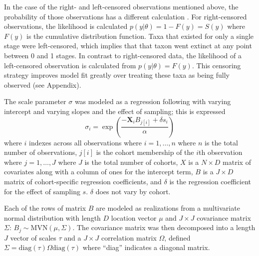 \documentclass[11pt]{article}
\begin{document}
In the case of the right- and left-censored observations mentioned above, the probability of those observations has a different calculation \citep{Klein2003}. For right-censored observations, the likelihood is calculated \(p(y | \theta) = 1 - F(y) = S(y)\) where \(F(y)\) is the cumulative distribution function. Taxa that existed for only a single stage were left-censored, which implies that that taxon went extinct at any point between 0 and 1 stages. In contrast to right-censored data, the likelihood of a left-censored observation is calculated from \(p(y | \theta) = F(y)\). This censoring strategy improves model fit greatly over treating these taxa as being fully observed (see Appendix). 

The scale parameter \(\sigma\) was modeled as a regression following \citet{Kleinbaum2005} with varying intercept and varying slopes and the effect of sampling; this is expressed
\begin{equation}
  \sigma_{i} = \exp\left(\frac{-\mathbf{X}_{i} B_{j[i]} + \delta s_{i}}{\alpha}\right)
  \label{eq:sigma}
\end{equation}
where \(i\) indexes across all observations where \(i = 1, \dots, n\) where \(n\) is the total number of observations, \(j[i]\) is the cohort membership of the \(i\)th observation where \(j = 1, \dots, J\) where \(J\) is the total number of cohorts, \(X\) is a \(N \times D\) matrix of covariates along with a column of ones for the intercept term, \(B\) is a \(J \times D\) matrix of cohort-specific regression coefficients, and \(\delta\) is the regression coefficient for the effect of sampling \(s\). \(\delta\) does not vary by cohort.

Each of the rows of matrix \(B\) are modeled as realizations from a multivariate normal distribution with length \(D\) location vector \(\mu\) and \(J \times J\) covariance matrix \(\Sigma\): \(B_{j} \sim \mathrm{MVN}(\mu, \Sigma)\). The covariance matrix was then decomposed into a length \(J\) vector of scales \(\tau\) and a \(J \times J\) correlation matrix \(\Omega\), defined \(\Sigma = \mathrm{diag}(\tau) \Omega \mathrm{diag}(\tau)\) where ``diag'' indicates a diagonal matrix.
\end{document}

